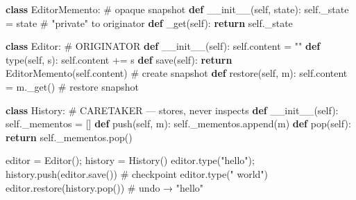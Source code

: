 \documentclass[11pt]{article}
\newenvironment{Shaded}{\begin{snugshade}}{\end{snugshade}}
\newcommand{\BuiltInTok}[1]{\textcolor[rgb]{0.50,0.55,0.55}{#1}}
\newcommand{\CommentTok}[1]{\textcolor[rgb]{0.48,0.49,0.49}{#1}}
\newcommand{\ControlFlowTok}[1]{\textcolor[rgb]{0.99,0.74,0.29}{\textbf{#1}}}
\newcommand{\FunctionTok}[1]{\textcolor[rgb]{0.56,0.27,0.68}{#1}}
\newcommand{\KeywordTok}[1]{\textcolor[rgb]{0.81,0.81,0.76}{\textbf{#1}}}
\newcommand{\NormalTok}[1]{\textcolor[rgb]{0.81,0.81,0.76}{#1}}
\newcommand{\OperatorTok}[1]{\textcolor[rgb]{0.81,0.81,0.76}{#1}}
\newcommand{\StringTok}[1]{\textcolor[rgb]{0.96,0.31,0.31}{#1}}
\newcommand{\VariableTok}[1]{\textcolor[rgb]{0.15,0.68,0.68}{#1}}
\begin{document}
\begin{Shaded}
\begin{Highlighting}[]
\KeywordTok{class}\NormalTok{ EditorMemento:                       }\CommentTok{\# opaque snapshot}
    \KeywordTok{def} \FunctionTok{\_\_init\_\_}\NormalTok{(}\VariableTok{self}\NormalTok{, state): }\VariableTok{self}\NormalTok{.\_state }\OperatorTok{=}\NormalTok{ state   }\CommentTok{\# "private" to originator}
    \KeywordTok{def}\NormalTok{ \_get(}\VariableTok{self}\NormalTok{): }\ControlFlowTok{return} \VariableTok{self}\NormalTok{.\_state}

\KeywordTok{class}\NormalTok{ Editor:                              }\CommentTok{\# ORIGINATOR}
    \KeywordTok{def} \FunctionTok{\_\_init\_\_}\NormalTok{(}\VariableTok{self}\NormalTok{): }\VariableTok{self}\NormalTok{.content }\OperatorTok{=} \StringTok{""}
    \KeywordTok{def} \BuiltInTok{type}\NormalTok{(}\VariableTok{self}\NormalTok{, s): }\VariableTok{self}\NormalTok{.content }\OperatorTok{+=}\NormalTok{ s}
    \KeywordTok{def}\NormalTok{ save(}\VariableTok{self}\NormalTok{): }\ControlFlowTok{return}\NormalTok{ EditorMemento(}\VariableTok{self}\NormalTok{.content)        }\CommentTok{\# create snapshot}
    \KeywordTok{def}\NormalTok{ restore(}\VariableTok{self}\NormalTok{, m): }\VariableTok{self}\NormalTok{.content }\OperatorTok{=}\NormalTok{ m.\_get()             }\CommentTok{\# restore snapshot}

\KeywordTok{class}\NormalTok{ History:                             }\CommentTok{\# CARETAKER — stores, never inspects}
    \KeywordTok{def} \FunctionTok{\_\_init\_\_}\NormalTok{(}\VariableTok{self}\NormalTok{): }\VariableTok{self}\NormalTok{.\_mementos }\OperatorTok{=}\NormalTok{ []}
    \KeywordTok{def}\NormalTok{ push(}\VariableTok{self}\NormalTok{, m): }\VariableTok{self}\NormalTok{.\_mementos.append(m)}
    \KeywordTok{def}\NormalTok{ pop(}\VariableTok{self}\NormalTok{): }\ControlFlowTok{return} \VariableTok{self}\NormalTok{.\_mementos.pop()}

\NormalTok{editor }\OperatorTok{=}\NormalTok{ Editor()}\OperatorTok{;}\NormalTok{ history }\OperatorTok{=}\NormalTok{ History()}
\NormalTok{editor.}\BuiltInTok{type}\NormalTok{(}\StringTok{"hello"}\NormalTok{)}\OperatorTok{;}\NormalTok{ history.push(editor.save())   }\CommentTok{\# checkpoint}
\NormalTok{editor.}\BuiltInTok{type}\NormalTok{(}\StringTok{" world"}\NormalTok{)}
\NormalTok{editor.restore(history.pop())                        }\CommentTok{\# undo → "hello"}
\end{Highlighting}
\end{Shaded}
\end{document}
